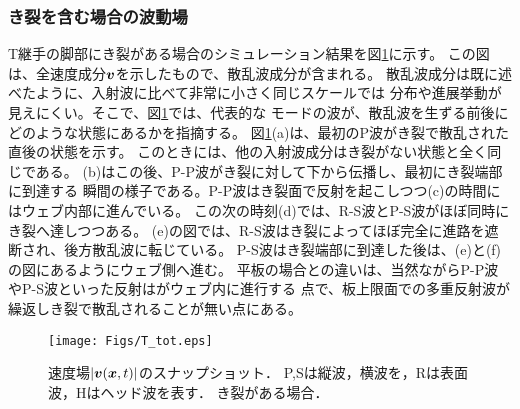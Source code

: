 \subsubsection{き裂を含む場合の波動場}
T継手の脚部にき裂がある場合のシミュレーション結果を図\ref{fig:fig3_6}に示す。
この図は、全速度成分$\mbox{\boldmath $v$}$を示したもので、散乱波成分が含まれる。
散乱波成分は既に述べたように、入射波に比べて非常に小さく同じスケールでは
分布や進展挙動が見えにくい。そこで、図\ref{fig:fig3_6}では、代表的な
モードの波が、散乱波を生ずる前後にどのような状態にあるかを指摘する。
図\ref{fig:fig3_6}(a)は、最初のP波がき裂で散乱された直後の状態を示す。
このときには、他の入射波成分はき裂がない状態と全く同じである。
(b)はこの後、P-P波がき裂に対して下から伝播し、最初にき裂端部に到達する
瞬間の様子である。P-P波はき裂面で反射を起こしつつ(c)の時間にはウェブ内部に進んでいる。
この次の時刻(d)では、R-S波とP-S波がほぼ同時にき裂へ達しつつある。
(e)の図では、R-S波はき裂によってほぼ完全に進路を遮断され、後方散乱波に転じている。
P-S波はき裂端部に到達した後は、(e)と(f)の図にあるようにウェブ側へ進む。
平板の場合との違いは、当然ながらP-P波やP-S波といった反射はがウェブ内に進行する
点で、板上限面での多重反射波が繰返しき裂で散乱されることが無い点にある。
\begin{figure}[h]
	\begin{center}
	\texttt{[image: Figs/T\_tot.eps]} 
	\end{center}
	\caption{
		速度場$|\mbox{\boldmath $v$}(\mbox{\boldmath $x$},t)|$のスナップショット．
		P,Sは縦波，横波を，Rは表面波，Hはヘッド波を表す．
		き裂がある場合．
	} 
	\label{fig:fig3_6}
\end{figure}
